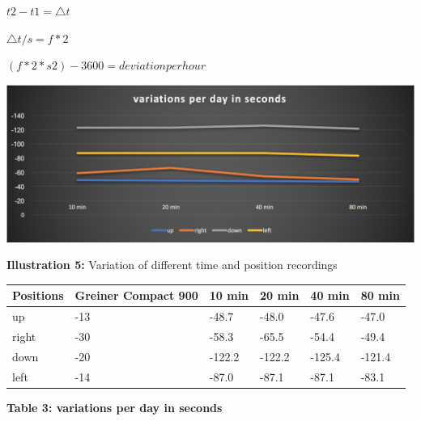 \documentclass[12pt, a4paper]{report}
\begin{document}
\(t2-t1 = \triangle t\)

\(\triangle t / s = f*2\)

\((f*2*s2)-3600=deviation per hour\)

\begin{center}
    \includegraphics[scale=0.3]{Images/variations_per_day.png}
    
    {\bf Illustration 5:} Variation of different time and position recordings
    \end{center}
\begin{table}[H]
    \begin{tabular}{|l|l|l|l|l|l|}
    \hline
    Positions & Greiner Compact 900 & 10 min & 20 min & 40 min & 80 min \\ \hline
    up        & -13                 & -48.7     & -48.0     & -47.6      & -47.0      \\ \hline
    right     & -30                 & -58.3      & -65.5    & -54.4      & -49.4      \\ \hline
    down      & -20                 & -122.2    & -122.2     & -125.4    & -121.4      \\ \hline
    left      & -14                 & -87.0	   & -87.1	  & -87.1	  & -83.1      \\ \hline
    \end{tabular}
\end{table}
\begin{center}    
{\bf Table 3: variations per day in seconds} 
\end{center}

\bigskip
\end{document}
